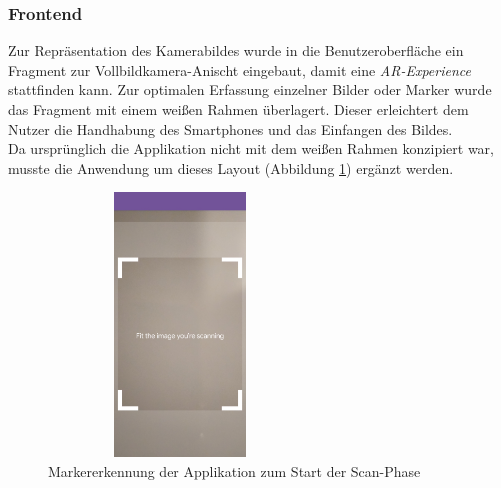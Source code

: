 \subsubsection{Frontend}
Zur Repräsentation des Kamerabildes wurde in die Benutzeroberfläche ein Fragment zur Vollbildkamera-Anischt eingebaut, damit eine \textit{\acs{AR}-Experience} 
stattfinden kann. Zur optimalen Erfassung einzelner Bilder oder Marker wurde das Fragment mit einem weißen Rahmen überlagert. Dieser erleichtert dem Nutzer die 
Handhabung des Smartphones und das Einfangen des Bildes. 
\\ 
\linebreak
Da ursprünglich die Applikation nicht mit dem weißen Rahmen konzipiert war, musste die Anwendung um dieses Layout (Abbildung \ref{pic:image_tracking}) 
ergänzt werden. 
\begin{figure}[hbt!]
    \centering
    \includegraphics[width=7cm,height=7cm,keepaspectratio]{4Umsetzung/Bilder/image_tracking.jpg}
    \caption{Markererkennung der Applikation zum Start der Scan-Phase}
    \label{pic:image_tracking}
\end{figure}
\pagebreak 
\\ %
